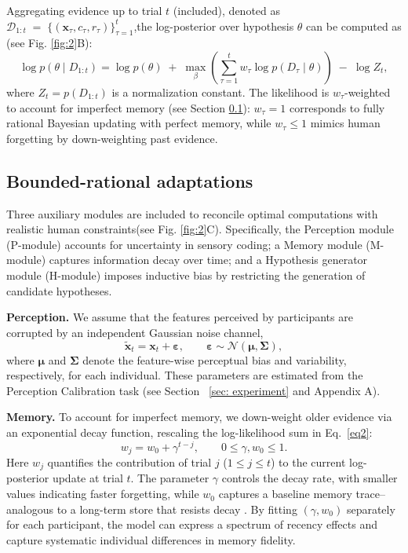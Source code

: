 Aggregating evidence up to trial $t$ (included), denoted as $\mathcal D_{1:t}\;=\;\bigl\{(\mathbf x_\tau,c_\tau,r_\tau)\bigr\}_{\tau=1}^{t}$,the log-posterior over hypothesis $\theta$ can be computed as (see Fig. \ref{fig:2}B):
\begin{equation}
    \log p(\theta\mid D_{1:t})=
    \log p(\theta)
    \;+\;
    \max_{\beta}\left(\sum_{\tau=1}^{t}w_\tau
        \log p(D_\tau\mid\theta)\right)
    \;-\;\log Z_t,
    \tag{2}
    \label{eq2}
\end{equation}
where ${{Z}_{t}}=p({{D}_{1:t}})$ is a normalization constant. The likelihood is $w_\tau$-weighted to account for imperfect memory (see Section \ref{sec:3.2}): $w_\tau = 1$ corresponds to fully rational Bayesian updating with perfect memory, while $w_\tau \le 1$ mimics human forgetting by down-weighting past evidence.

\subsection{Bounded-rational adaptations} \label{sec:3.2}
Three auxiliary modules are included to reconcile optimal computations with realistic human constraints(see Fig. \ref{fig:2}C). Specifically, the Perception module (P-module) accounts for uncertainty in sensory coding; a Memory module (M-module) captures information decay over time; and a Hypothesis generator module (H-module) imposes inductive bias by restricting the generation of candidate hypotheses. 

\textbf{Perception.} We assume that the features perceived by participants are corrupted by an independent Gaussian noise channel,
\begin{equation}
\tilde{\mathbf{x}}_t = \mathbf{x}_t + \boldsymbol{\varepsilon}, \qquad \boldsymbol{\varepsilon} \sim \mathcal{N}(\boldsymbol{\mu}, \boldsymbol{\Sigma}),
\tag{3}
\end{equation}
where $\boldsymbol{\mu}$ and $\boldsymbol{\Sigma}$ denote the feature-wise perceptual bias and variability, respectively, for each individual. These parameters are estimated from the Perception Calibration task (see Section ~\ref{sec: experiment} and Appendix A).

\textbf{Memory.} To account for imperfect memory, we down-weight older evidence via an exponential decay function, rescaling the log-likelihood sum in Eq.~\eqref{eq2}:
\begin{equation}
    w_j = w_0+\gamma^{t-j},\qquad 0\le\gamma,w_0\le 1 .
    \tag{4}
\end{equation}
Here $w_j$ quantifies the contribution of trial $j$ ($1 \le j \le t$) to the current log-posterior update at trial $t$. The parameter $\gamma$ controls the decay rate, with smaller values indicating faster forgetting, while $w_0$ captures a baseline memory trace--analogous to a long-term store that resists decay \cite{lewandowsky2009no}. By fitting $(\gamma,w_0)$ separately for each participant, the model can express a spectrum of recency effects and capture systematic individual differences in memory fidelity.

